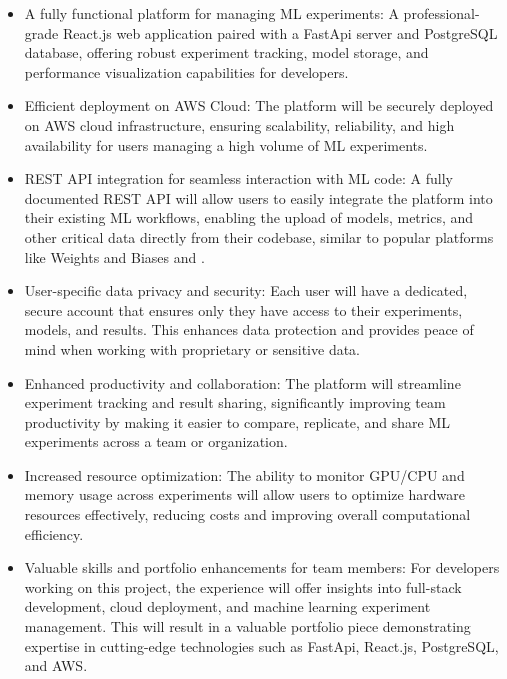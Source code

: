 \documentclass[12pt]{article}
\begin{document}
\begin{itemize}
\item A fully functional platform for managing ML experiments: A professional-grade React.js \cite{reactjs} web application paired with a FastApi \cite{fastapi} server and PostgreSQL \cite{postgresql} database, offering robust experiment tracking, model storage, and performance visualization capabilities for developers.

\item Efficient deployment on AWS Cloud: The platform will be securely deployed on AWS \cite{aws} cloud infrastructure, ensuring scalability, reliability, and high availability for users managing a high volume of ML experiments.

\item REST API integration for seamless interaction with ML code: A fully documented REST API will allow users to easily integrate the platform into their existing ML workflows, enabling the upload of models, metrics, and other critical data directly from their codebase, similar to popular platforms like Weights and Biases \cite{wandb} and \cite{mlflow}.

\item User-specific data privacy and security: Each user will have a dedicated, secure account that ensures only they have access to their experiments, models, and results. This enhances data protection and provides peace of mind when working with proprietary or sensitive data.

\item Enhanced productivity and collaboration: The platform will streamline experiment tracking and result sharing, significantly improving team productivity by making it easier to compare, replicate, and share ML experiments across a team or organization.

\item Increased resource optimization: The ability to monitor GPU/CPU and memory usage across experiments will allow users to optimize hardware resources effectively, reducing costs and improving overall computational efficiency.

\item Valuable skills and portfolio enhancements for team members: For developers working on this project, the experience will offer insights into full-stack development, cloud deployment, and machine learning experiment management. This will result in a valuable portfolio piece demonstrating expertise in cutting-edge technologies such as FastApi, React.js, PostgreSQL, and AWS.

\end{itemize}
\end{document}
